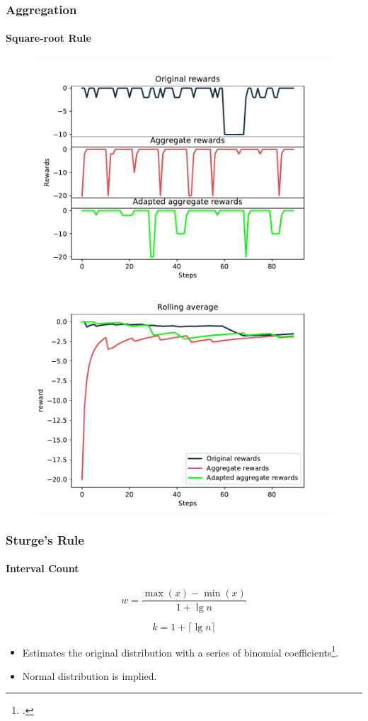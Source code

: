 \documentclass[mathserif]{beamer}
\begin{document}
    \begin{frame}
        \frametitle{Aggregation}
        \framesubtitle{Square-root Rule}

        \begin{figure}
            \label{fig:square-root-rewards}
            \centering
            \includegraphics[width=0.46\columnwidth]{res/experiments/sqrt_steps_rewards.pdf}
            \qquad
            \includegraphics[width=0.46\columnwidth]{res/experiments/sqrt_rolling_rewards.pdf}
        \end{figure}

    \end{frame}


    \begin{frame}
        \frametitle{Sturge's Rule}
        \framesubtitle{Interval Count}


        \begin{equation}
            \label{eq:sturge_method_width}
            w = \frac{\max(x) - \min(x)}{1 + \lg{n}}
        \end{equation}

        \begin{equation}
            \label{eq:sturge_method_count}
            k = 1 + \lceil \lg{n} \rceil
        \end{equation}


        \begin{itemize}
            \item Estimates the original distribution with a series of binomial coefficients\footcite{Sturges1926}.
            \item Normal distribution is implied.
        \end{itemize}
    \end{frame}
\end{document}
